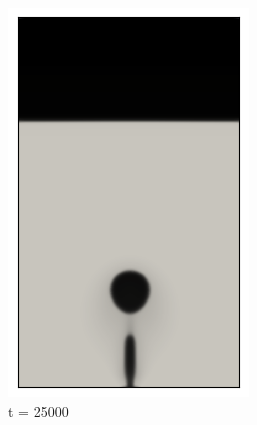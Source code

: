 \begin{figure}[H]
	\medskip
	\begin{subfigure}{0.25\textwidth}
		\includegraphics[width=\linewidth]{figs/cap4/bb_760_s25}
		\caption{t = 25000}
		\label{fig:4}
	\end{subfigure}\hfil  
	\begin{subfigure}{0.25\textwidth}

\end{subfigure}
\end{figure}
